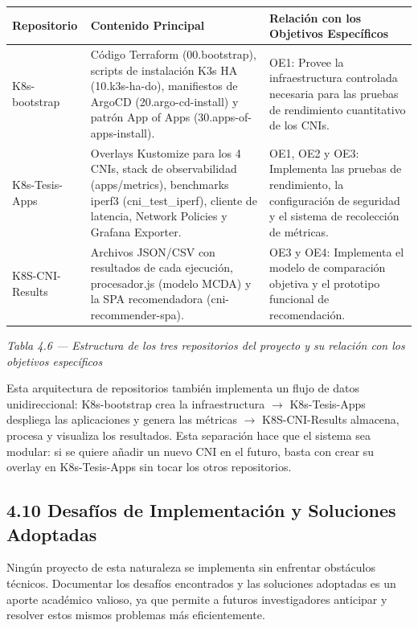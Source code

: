 \documentclass[journal]{IEEEtran}
\begin{document}
\begin{table}[htbp]
\centering
\scriptsize
\begin{tabularx}{\textwidth}{|Y|Y|Y|}
\hline
\textbf{Repositorio} & \textbf{Contenido Principal} & \textbf{Relación con los Objetivos Específicos} \\
\hline
K8s-bootstrap & Código Terraform (00.bootstrap), scripts de instalación K3s HA (10.k3s-ha-do), manifiestos de ArgoCD (20.argo-cd-install) y patrón App of Apps (30.apps-of-apps-install). & OE1: Provee la infraestructura controlada necesaria para las pruebas de rendimiento cuantitativo de los CNIs. \\
K8s-Tesis-Apps & Overlays Kustomize para los 4 CNIs, stack de observabilidad (apps/metrics), benchmarks iperf3 (cni\_test\_iperf), cliente de latencia, Network Policies y Grafana Exporter. & OE1, OE2 y OE3: Implementa las pruebas de rendimiento, la configuración de seguridad y el sistema de recolección de métricas. \\
K8S-CNI-Results & Archivos JSON/CSV con resultados de cada ejecución, procesador.js (modelo MCDA) y la SPA recomendadora (cni-recommender-spa). & OE3 y OE4: Implementa el modelo de comparación objetiva y el prototipo funcional de recomendación. \\
\hline
\end{tabularx}
\end{table}

\begin{center}\emph{\emph{Tabla 4.6 --- Estructura de los tres repositorios del proyecto y su relación con los objetivos específicos}}\end{center}

Esta arquitectura de repositorios también implementa un flujo de datos unidireccional: K8s-bootstrap crea la infraestructura $\rightarrow$ K8s-Tesis-Apps despliega las aplicaciones y genera las métricas $\rightarrow$ K8S-CNI-Results almacena, procesa y visualiza los resultados. Esta separación hace que el sistema sea modular: si se quiere añadir un nuevo CNI en el futuro, basta con crear su overlay en K8s-Tesis-Apps sin tocar los otros repositorios.

\subsection{4.10 Desafíos de Implementación y Soluciones Adoptadas}

Ningún proyecto de esta naturaleza se implementa sin enfrentar obstáculos técnicos. Documentar los desafíos encontrados y las soluciones adoptadas es un aporte académico valioso, ya que permite a futuros investigadores anticipar y resolver estos mismos problemas más eficientemente.
\end{document}
